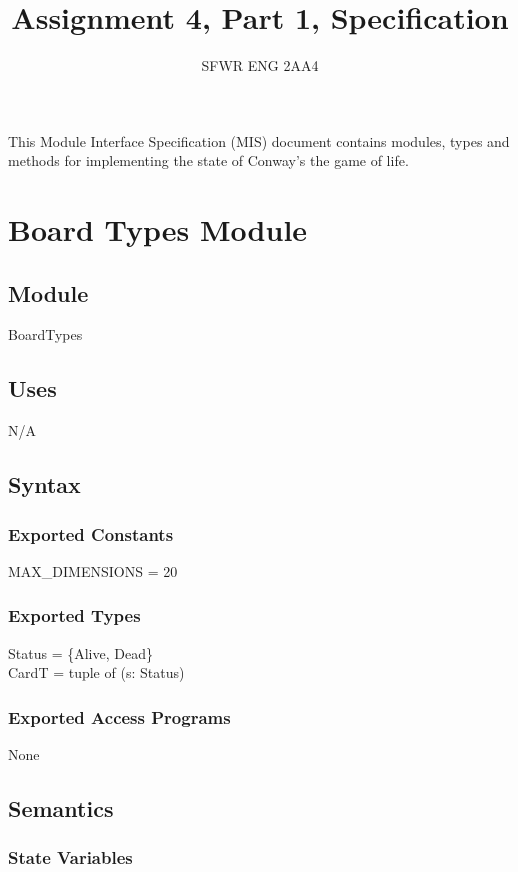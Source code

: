 \documentclass[12pt]{article}
\title{Assignment 4, Part 1, Specification}
\author{SFWR ENG 2AA4}
\begin{document}
\maketitle
This Module Interface Specification (MIS) document contains modules, types and
methods for implementing the state of Conway's the game of life.

\newpage

\section* {Board Types Module}

\subsection*{Module}

BoardTypes

\subsection* {Uses}

N/A

\subsection* {Syntax}

\subsubsection* {Exported Constants}

MAX\_DIMENSIONS = 20

\subsubsection* {Exported Types}

Status = \{Alive, Dead\}\\ 
CardT = tuple of (s: Status)

\subsubsection* {Exported Access Programs}

None

\subsection* {Semantics}

\subsubsection* {State Variables}
\end{document}
